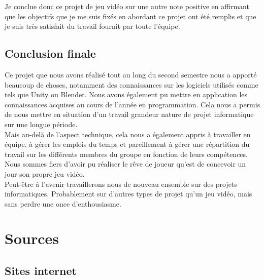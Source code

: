\documentclass[12pt, titlepage]{article}
\begin{document}
\begin{spacing}{1.5}
Je conclue donc ce projet de jeu vidéo sur une autre note positive en affirmant que les objectifs que je me suis fixés en abordant ce projet ont été remplis et que je suis très satisfait du travail fournit par toute l’équipe.\\

\newpage

\subsection{Conclusion finale}

Ce projet que nous avons réalisé tout au long du second semestre nous a apporté beaucoup de choses, notamment des connaissances sur les logiciels utilisés comme tels que Unity ou Blender. Nous avons également pu mettre en application les connaissances acquises au cours de l'année en programmation. Cela nous a permis de nous mettre en situation d'un travail grandeur nature de projet informatique sur une longue période.\\

Mais au-delà de l'aspect technique, cela nous a également appris à travailler en équipe, à gérer les emplois du temps et pareillement à gérer une répartition du travail sur les différents membres du groupe en fonction de leurs compétences. Nous sommes fiers d'avoir pu réaliser le rêve de joueur qu'est de concevoir un jour son propre jeu vidéo.\\

Peut-être à l'avenir travaillerons nous de nouveau ensemble sur des projets informatiques. Probablement sur d'autres types de projet qu'un jeu vidéo, mais sans perdre une once d'enthousiasme.

\newpage
\section{Sources}
\subsection{Sites internet}


\end{spacing}
\end{document}
